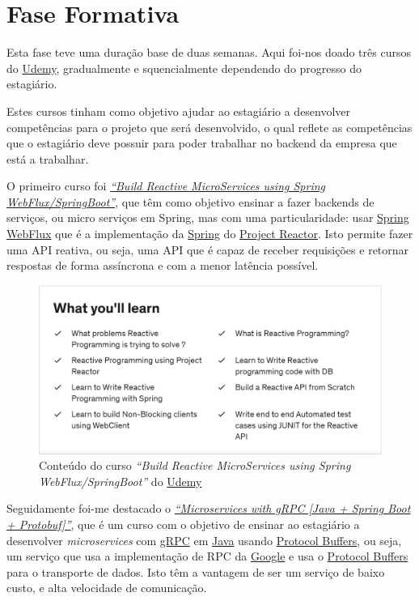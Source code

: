 \newpage

\section{Fase Formativa}

Esta fase teve uma duração base de duas semanas. Aqui foi-nos doado três cursos do \href{https://www.udemy.com/}{Udemy}, gradualmente e squencialmente dependendo do progresso do estagiário.

Estes cursos tinham como objetivo ajudar ao estagiário a desenvolver competências para o projeto que será desenvolvido, o qual reflete as competências que o estagiário deve possuir para poder trabalhar no backend da empresa que está a trabalhar.

O primeiro curso foi \href{https://www.udemy.com/course/build-reactive-restful-apis-using-spring-boot-webflux/}{\textit{``Build Reactive MicroServices using Spring WebFlux/SpringBoot''}}, que têm como objetivo ensinar a fazer backends de serviços, ou micro serviços em Spring, mas com uma particularidade: usar \href{https://spring.io/reactive}{Spring WebFlux} que é a implementação da \href{https://spring.io/}{Spring} do \href{https://projectreactor.io/}{Project Reactor}. Isto permite fazer uma API reativa, ou seja, uma API que é capaz de receber requisições e retornar respostas de forma assíncrona e com a menor latência possível.

\begin{figure}[!hbt]
  \centering
  \includegraphics[width=14cm]{figuras/udemy1.png}
  \caption{Conteúdo do curso \textit{``Build Reactive MicroServices using Spring WebFlux/SpringBoot''} do \href{https://www.udemy.com/}{Udemy}}
  \label{fig:udemy1}
\end{figure}
\FloatBarrier

Seguidamente foi-me destacado o \href{https://www.udemy.com/course/grpc-the-complete-guide-for-java-developers/}{\textit{``Microservices with gRPC [Java + Spring Boot + Protobuf]''}}, que é um curso com o objetivo de ensinar ao estagiário a desenvolver \textit{microservices} com \href{https://grpc.io/}{gRPC} em \href{https://jdk.java.net/}{Java} usando \href{https://developers.google.com/protocol-buffers}{Protocol Buffers}, ou seja, um serviço que usa a implementação de RPC da \href{https://abc.xyz/}{Google} e usa o \href{https://developers.google.com/protocol-buffers}{Protocol Buffers} para o transporte de dados. Isto têm a vantagem de ser um serviço de baixo custo, e alta velocidade de comunicação.

